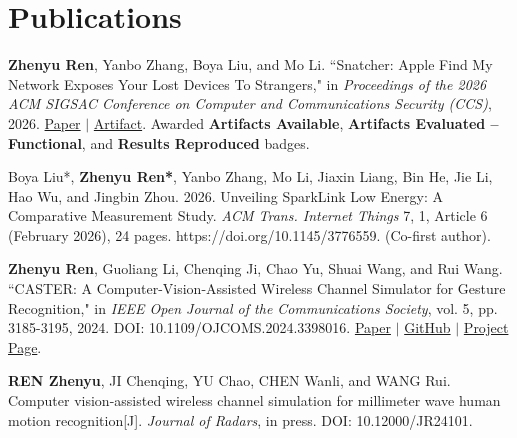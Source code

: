 \documentclass[letterpaper,10pt]{article}
\newcommand{\resumeSubHeadingListStart}{\begin{itemize}[leftmargin=0.15in, label={}]}
\newcommand{\resumeSubHeadingListEnd}{\end{itemize}\vspace{-5pt}}
\begin{document}
\section{Publications}
\vspace{3pt}
\resumeSubHeadingListStart
\small{\item{
    \textbf{Zhenyu Ren}, Yanbo Zhang, Boya Liu, and Mo Li. ``Snatcher: Apple Find My Network Exposes Your Lost Devices To Strangers," in \textit{Proceedings of the 2026 ACM SIGSAC Conference on Computer and Communications Security (CCS)}, 2026.
    \href{https://arxiv.org/abs/2606.21067}{\color{blue}Paper} $|$ \href{https://github.com/rzy0901/Snatcher}{\color{blue}Artifact}.
    Awarded \textbf{Artifacts Available}, \textbf{Artifacts Evaluated -- Functional}, and \textbf{Results Reproduced} badges.

    Boya Liu*, \textbf{Zhenyu Ren*}, Yanbo Zhang, Mo Li, Jiaxin Liang, Bin He, Jie Li, Hao Wu, and Jingbin Zhou. 2026. Unveiling SparkLink Low Energy: A Comparative Measurement Study. \textit{ACM Trans. Internet Things} 7, 1, Article 6 (February 2026), 24 pages. https://doi.org/10.1145/3776559. (Co-first author).

    \textbf{Zhenyu Ren}, Guoliang Li, Chenqing Ji, Chao Yu, Shuai Wang, and Rui Wang. ``CASTER: A Computer-Vision-Assisted Wireless Channel Simulator for Gesture Recognition," in \textit{IEEE Open Journal of the Communications Society}, vol. 5, pp. 3185-3195, 2024. DOI: 10.1109/OJCOMS.2024.3398016.
    \href{https://doi.org/10.1109/ojcoms.2024.3398016}{\color{blue}Paper} $|$ \href{https://github.com/rzy0901/testSpectrogram}{\color{blue}GitHub}  $|$ \href{https://lasso-sustech.github.io/CASTER/}{\color{blue}Project Page}.
    }
    \item{\textbf{REN Zhenyu}, JI Chenqing, YU Chao, CHEN Wanli, and WANG Rui. Computer vision-assisted wireless channel simulation for millimeter wave human motion recognition[J]. \textit{Journal of Radars},  in press. DOI:  10.12000/JR24101.
    }
}
\resumeSubHeadingListEnd

\end{document}
